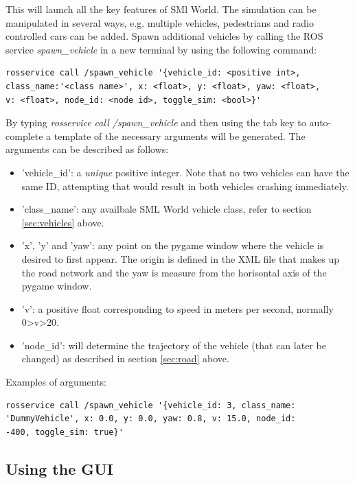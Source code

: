 \documentclass[11pt,a4paper]{book}
\begin{document}
\noindent This will launch all the key features of SMl World. The simulation can be manipulated in several ways, e.g. multiple vehicles, pedestrians and radio controlled cars can be added. Spawn additional vehicles by calling the ROS service \textit{spawn\_vehicle} in a new terminal by using the following command:

\begin{verbatim}
rosservice call /spawn_vehicle '{vehicle_id: <positive int>, 
class_name:'<class name>', x: <float>, y: <float>, yaw: <float>, 
v: <float>, node_id: <node id>, toggle_sim: <bool>}'
\end{verbatim}

\noindent By typing \textit{rosservice call /spawn\_vehicle} and then using the tab key to auto-complete a template of the necessary arguments will be generated. The arguments can be described as follows:
      \begin{itemize}
        \item 'vehicle\_id': a \textit{unique} positive integer. Note that no two vehicles can have the same ID, attempting that would result in both vehicles crashing immediately. 
        \item 'class\_name': any availbale SML World vehicle class, refer to section \ref{sec:vehicles} above. 
        \item 'x', 'y' and 'yaw': any point on the pygame window where the vehicle is desired to first appear. The origin is defined in the XML file that makes up the road network and the yaw is measure from the horisontal axis of the pygame window. 
        \item 'v': a positive float corresponding to speed in meters per second, normally 0>v>20. 
        \item 'node\_id': will determine the trajectory of the vehicle (that can later be changed) as described in section \ref{sec:road} above. 
      \end{itemize}

\noindent Examples of arguments:

\begin{verbatim}
rosservice call /spawn_vehicle '{vehicle_id: 3, class_name:
'DummyVehicle', x: 0.0, y: 0.0, yaw: 0.8, v: 15.0, node_id: 
-400, toggle_sim: true}'
\end{verbatim}

\subsection{Using the GUI}
\end{document}
